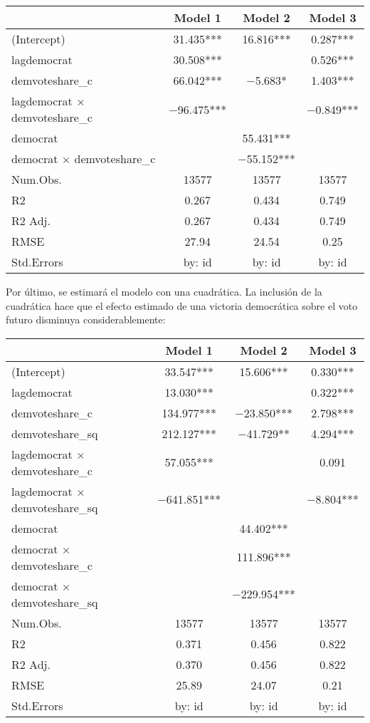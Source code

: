 \documentclass[
]{article}
\begin{document}
\begin{table}
\centering
\begin{tabular}[t]{lccc}
\toprule
  & Model 1 & Model 2 & Model 3\\
\midrule
(Intercept) & \num{31.435}*** & \num{16.816}*** & \num{0.287}***\\
lagdemocrat & \num{30.508}*** &  & \num{0.526}***\\
demvoteshare\_c & \num{66.042}*** & \num{-5.683}* & \num{1.403}***\\
lagdemocrat × demvoteshare\_c & \num{-96.475}*** &  & \num{-0.849}***\\
democrat &  & \num{55.431}*** & \\
democrat × demvoteshare\_c &  & \num{-55.152}*** & \\
\midrule
Num.Obs. & \num{13577} & \num{13577} & \num{13577}\\
R2 & \num{0.267} & \num{0.434} & \num{0.749}\\
R2 Adj. & \num{0.267} & \num{0.434} & \num{0.749}\\
RMSE & \num{27.94} & \num{24.54} & \num{0.25}\\
Std.Errors & by: id & by: id & by: id\\
\bottomrule
\end{tabular}
\end{table}

Por último, se estimará el modelo con una cuadrática. La inclusión de la
cuadrática hace que el efecto estimado de una victoria democrática sobre
el voto futuro disminuya considerablemente:

\begin{table}
\centering
\begin{tabular}[t]{lccc}
\toprule
  & Model 1 & Model 2 & Model 3\\
\midrule
(Intercept) & \num{33.547}*** & \num{15.606}*** & \num{0.330}***\\
lagdemocrat & \num{13.030}*** &  & \num{0.322}***\\
demvoteshare\_c & \num{134.977}*** & \num{-23.850}*** & \num{2.798}***\\
demvoteshare\_sq & \num{212.127}*** & \num{-41.729}** & \num{4.294}***\\
lagdemocrat × demvoteshare\_c & \num{57.055}*** &  & \num{0.091}\\
lagdemocrat × demvoteshare\_sq & \num{-641.851}*** &  & \num{-8.804}***\\
democrat &  & \num{44.402}*** & \\
democrat × demvoteshare\_c &  & \num{111.896}*** & \\
democrat × demvoteshare\_sq &  & \num{-229.954}*** & \\
\midrule
Num.Obs. & \num{13577} & \num{13577} & \num{13577}\\
R2 & \num{0.371} & \num{0.456} & \num{0.822}\\
R2 Adj. & \num{0.370} & \num{0.456} & \num{0.822}\\
RMSE & \num{25.89} & \num{24.07} & \num{0.21}\\
Std.Errors & by: id & by: id & by: id\\
\bottomrule
\end{tabular}
\end{table}
\end{document}

